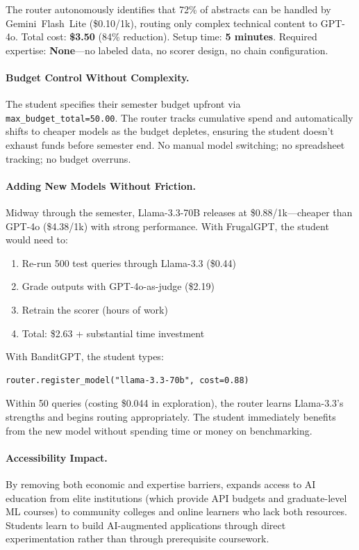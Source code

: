 The router autonomously identifies that 72\% of abstracts can be handled by Gemini~Flash~Lite (\$0.10/1k), routing only complex technical content to GPT-4o. Total cost: \textbf{\$3.50} (84\% reduction). Setup time: \textbf{5 minutes}. Required expertise: \textbf{None}---no labeled data, no scorer design, no chain configuration.

\paragraph{Budget Control Without Complexity.}
The student specifies their semester budget upfront via \texttt{max\_budget\_total=50.00}. The router tracks cumulative spend and automatically shifts to cheaper models as the budget depletes, ensuring the student doesn't exhaust funds before semester end. No manual model switching; no spreadsheet tracking; no budget overruns.

\paragraph{Adding New Models Without Friction.}
Midway through the semester, Llama-3.3-70B releases at \$0.88/1k---cheaper than GPT-4o (\$4.38/1k) with strong performance. With FrugalGPT, the student would need to:
\begin{enumerate}[leftmargin=*,nosep]
    \item Re-run 500 test queries through Llama-3.3 (\$0.44)
    \item Grade outputs with GPT-4o-as-judge (\$2.19)
    \item Retrain the scorer (hours of work)
    \item Total: \$2.63 + substantial time investment
\end{enumerate}

With BanditGPT, the student types:
\begin{small}
\begin{verbatim}
router.register_model("llama-3.3-70b", cost=0.88)
\end{verbatim}
\end{small}

Within 50 queries (costing \$0.044 in exploration), the router learns Llama-3.3's strengths and begins routing appropriately. The student immediately benefits from the new model without spending time or money on benchmarking.

\paragraph{Accessibility Impact.} By removing both economic and expertise barriers, \ours{} expands access to AI education from elite institutions (which provide API budgets and graduate-level ML courses) to community colleges and online learners who lack both resources. Students learn to build AI-augmented applications through direct experimentation rather than through prerequisite coursework.

